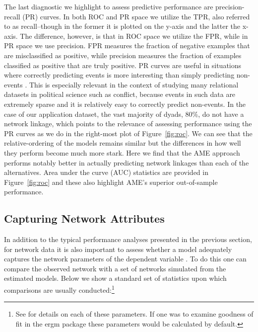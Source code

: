 \documentclass[12pt,pdflatex]{elsarticle}
\newcommand{\pkg}[1]{{\fontseries{b}\selectfont #1}}
\begin{document}
The last diagnostic we highlight to assess predictive performance are precision-recall (PR) curves. In both ROC and PR space we utilize the TPR, also referred to as recall--though in the former it is plotted on the y-axis and the latter the x-axis. The difference, however, is that in ROC space we utilize the FPR, while in PR space we use precision. FPR measures the fraction of negative examples that are misclassified as positive, while precision measures the fraction of examples classified as positive that are truly positive. PR curves are useful in situations where correctly predicting events is more interesting than simply predicting non-events \citep{davis:goadrich:2006}. This is especially relevant in the context of studying many relational datasets in political science such as conflict, because events in such data are extremely sparse and it is relatively easy to correctly predict non-events. In the case of our application dataset, the vast majority of dyads, 80\%, do not have a network linkage, which points to the relevance of assessing performance using the PR curves as we do in the right-most plot of Figure~\ref{fig:roc}. We can see that the relative-ordering of the models remains similar but the differences in how well they perform become much more stark. Here we find that the AME approach performs notably better in actually predicting network linkages than each of the alternatives. Area under the curve (AUC) statistics are provided in Figure~\ref{fig:roc} and these also highlight AME's superior out-of-sample performance.

\subsection{Capturing Network Attributes}

In addition to the typical performance analyses presented in the previous section, for network data it is also important to assess whether a model adequately captures the network parameters of the dependent variable \citep{hunter:etal:2008}. To do this one can compare the observed network with a set of networks simulated from the estimated models. Below we show a standard set of statistics upon which comparisons are usually conducted:\footnote{See \citet{morris:etal:2008} for details on each of these parameters. If one was to examine goodness of fit in the \pkg{ergm} package these parameters would be calculated by default.}
\end{document}
